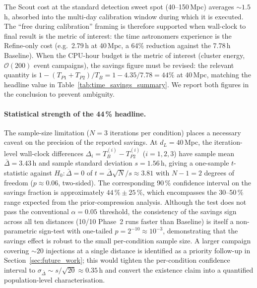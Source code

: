 \documentclass[12pt]{article}
\begin{document}
The Scout cost at the standard detection sweet spot (40--150\,Mpc) averages $\sim 1.5$\,h, absorbed into the multi-day calibration window during which it is executed. The ``free during calibration'' framing is therefore supported when wall-clock to final result is the metric of interest: the time astronomers experience is the Refine-only cost (e.g.\ 2.79\,h at 40\,Mpc, a 64\% reduction against the 7.78\,h Baseline). When the CPU-hour budget is the metric of interest (cluster energy, $\mathcal{O}(200)$ event campaigns), the savings figure must be revised: the relevant quantity is $1 - (T_{P1} + T_{P2}) / T_B = 1 - 4.35/7.78 = 44\%$ at 40\,Mpc, matching the headline value in Table~\ref{tab:time_savings_summary}. We report both figures in the conclusion to prevent ambiguity.

\paragraph{Statistical strength of the 44\,\% headline.}
The sample-size limitation ($N=3$ iterations per condition) places a necessary caveat on the precision of the reported savings. At $d_L = 40$\,Mpc, the iteration-level wall-clock differences $\Delta_i = T_B^{(i)} - T_{P2}^{(i)}$ ($i=1,2,3$) have sample mean $\bar\Delta = 3.43$\,h and sample standard deviation $s = 1.56$\,h, giving a one-sample $t$-statistic against $H_0\!:\!\bar\Delta = 0$ of $t = \bar\Delta\sqrt{N}/s \approx 3.81$ with $N{-}1 = 2$ degrees of freedom ($p \approx 0.06$, two-sided). The corresponding 90\,\% confidence interval on the savings fraction is approximately $44\,\% \pm 25\,\%$, which encompasses the 30--50\,\% range expected from the prior-compression analysis. Although the test does not pass the conventional $\alpha=0.05$ threshold, the consistency of the savings sign across all ten distances (10/10 Phase~2 runs faster than Baseline) is itself a non-parametric sign-test with one-tailed $p = 2^{-10} \approx 10^{-3}$, demonstrating that the savings effect is robust to the small per-condition sample size. A larger campaign covering $\sim 20$ injections at a single distance is identified as a priority follow-up in Section~\ref{sec:future_work}; this would tighten the per-condition confidence interval to $\sigma_{\bar\Delta} \sim s/\sqrt{20} \approx 0.35$\,h and convert the existence claim into a quantified population-level characterisation.
\end{document}
